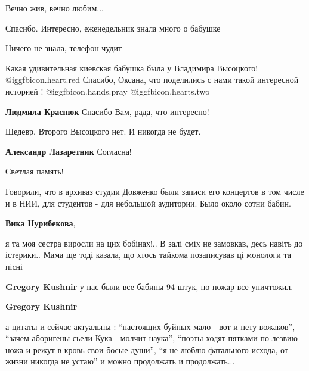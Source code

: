  
 
 
 
 
\zzSecCmt

\begin{itemize} %
Вечно жив, вечно любим...

Спасибо. Интересно, еженедельник знала много о бабушке

Ничего не знала, телефон чудит


Какая удивительная киевская бабушка была у Владимира Высоцкого! @igg{fbicon.heart.red} Спасибо,
Оксана, что поделились с нами такой интересной историей ! @igg{fbicon.hands.pray}  @igg{fbicon.hearts.two} 

\textbf{Людмила Краснюк} Спасибо Вам, рада, что интересно!

Шедевр. Второго Высоцкого нет. И никогда не будет.

\textbf{Александр Лазаретник} Согласна!

Светлая память!


Говорили, что в архиваз студии Довженко были записи его концертов в том числе и
в НИИ, для студентов - для небольшой аудитории. Было около сотни бабин.

\begin{itemize} %
\textbf{Вика Нурибекова}, 

я та моя сестра виросли на цих бобінах!.. В залі сміх не замовкав, десь навіть
до істерики.. Мама ще тоді казала, що хтось тайкома позаписував ці монологи та
пісні

\textbf{Gregory Kushnir} у нас были все бабины 94 штук, но пожар все уничтожил.

\textbf{Gregory Kushnir} 

а цитаты и сейчас актуальны : \enquote{настоящих буйных мало - вот и нету вожаков},
\enquote{зачем аборигены сьели Кука - молчит наука}, \enquote{поэты ходят пятками по лезвию
ножа и режут в кровь свои босые души}, \enquote{я не люблю фатального исхода, от жизни
никогда не устаю} и можно продолжать и продолжать...



\end{itemize}
\end{itemize}
